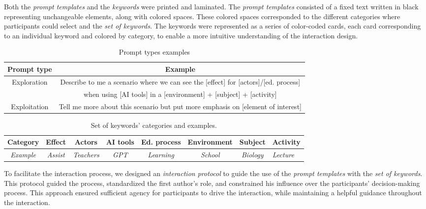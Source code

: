 \documentclass[sn-mathphys, Numbered]{sn-jnl}%
\theoremstyle{thmstyleone}%
\theoremstyle{thmstyletwo}%
\theoremstyle{thmstylethree}%
\begin{document}
Both the \textit{prompt templates} and the \textit{keywords} were printed and laminated. The \textit{prompt templates} consisted of a fixed text written in black representing unchangeable elements, along with colored spaces. These colored spaces corresponded to the different categories where participants could select and the \textit{set of keywords.} The keywords were represented as a series of color-coded cards, each card corresponding to an individual keyword and colored by category, to enable a more intuitive understanding of the interaction design.


\begin{table}
    \centering \caption{Prompt types examples}
    \begin{tabular}{c|c}
         Prompt type& Example\\
         \hline
         Exploration& Describe to me a scenario where we can see the [effect] for [actors]/[ed. process]\\
 & when using [AI tools] in a [environment] + [subject] + [activity]\\
         Exploitation& Tell me more about this scenario but put more emphasis on [element of interest]\\
         \hline
    \end{tabular}
    \label{tab:prompt types}
\end{table}


\begin{table}
    \centering \caption{Set of keywords' categories and examples.}
    \begin{tabular}{c|c|c|c|c|c|c|l}
         Category&  Effect&  Actors&  AI tools&  Ed. process&  Environment& Subject&Activity\\
         \hline
         \textit{Example}&  \textit{Assist}&  \textit{Teachers}&  \textit{GPT}&  \textit{Learning}&  \textit{School}&  \textit{Biology}&\textit{Lecture}\\
    \end{tabular}
    \label{tab:set of keywords}
\end{table}


To facilitate the interaction process, we designed an \textit{interaction protocol} to guide the use of the \textit{prompt templates} with the \textit{set of keywords}. This protocol guided the process, standardized the first author's role, and constrained his influence over the participants' decision-making process. This approach ensured sufficient agency for participants to drive the interaction, while maintaining a helpful guidance throughout the interaction.
\end{document}
